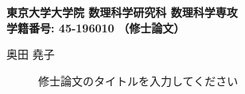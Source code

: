 \documentclass[twocolumn]{jarticle}
\newcommand{\school}[1]{\hfill\break\noindent\textbf{#1}}
\newenvironment{master}{\hfill\break\noindent\textbf{（修士論文）}\begin{description}}{\end{description}}
\begin{document}
\school{東京大学大学院 数理科学研究科 数理科学専攻\\ 学籍番号: 45-196010}
\begin{master}
\item[奥田 堯子]{修士論文のタイトルを入力してください}
\end{master}
\end{document}

